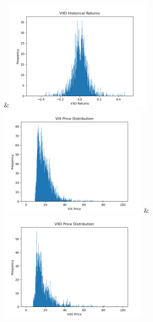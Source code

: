 \documentclass[12pt, a4paper]{article}
\theoremstyle{definition}
\begin{document}
\begin{table}[H]
\begin{tabu}
		&\includegraphics[width=75mm]{VXO Historical Returns} \\
		\includegraphics[width = 75mm]{VIX Price.png}
		& \includegraphics[width = 75mm]{VXO Price.png}
	\end{tabu}
\end{table}
\end{document}
